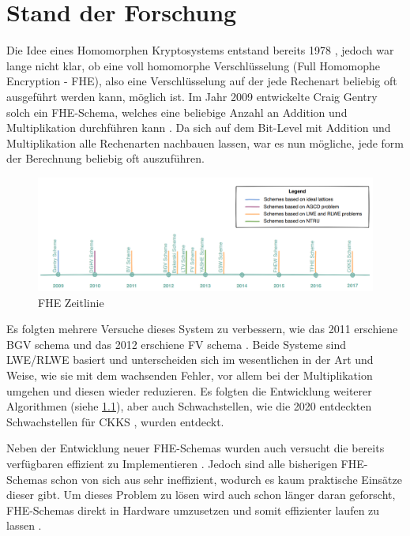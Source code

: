 \chapter{Stand der Forschung}
\label{StandDerForschung}

Die Idee eines Homomorphen Kryptosystems entstand bereits 1978 \cite{Rivest1978ONDB}, jedoch war lange nicht klar, ob eine voll homomorphe Verschlüsselung (Full Homomophe Encryption - FHE), also eine Verschlüsselung auf der jede Rechenart beliebig oft ausgeführt werden kann, möglich ist. Im Jahr 2009 entwickelte Craig Gentry solch ein FHE-Schema, welches eine beliebige Anzahl an Addition und Multiplikation durchführen kann \cite{Gentry2009AFH}. Da sich auf dem Bit-Level mit Addition und Multiplikation alle Rechenarten nachbauen lassen, war es nun mögliche, jede form der Berechnung beliebig oft auszuführen.

\begin{figure}
  \includegraphics[scale=0.45]{bilder/FHE-Timeline.png}
  \caption{FHE Zeitlinie \cite{FHESurvey}}
  \label{fig:FheTimeline}
\end{figure}

Es folgten mehrere Versuche dieses System zu verbessern, wie das 2011 erschiene BGV schema \cite{BGV} und das 2012 erschiene FV schema \cite{FV}. Beide Systeme sind LWE/RLWE basiert und unterscheiden sich im wesentlichen in der Art und Weise, wie sie mit dem wachsenden Fehler, vor allem bei der Multiplikation umgehen und diesen wieder reduzieren. Es folgten die Entwicklung weiterer Algorithmen (siehe \ref{fig:FheTimeline}), aber auch Schwachstellen, wie die 2020 entdeckten Schwachstellen für CKKS \cite{SecurtyCKKS}, wurden entdeckt.

Neben der Entwicklung neuer FHE-Schemas wurden auch versucht die bereits verfügbaren effizient zu Implementieren  \cite{FheImplementations}. Jedoch sind alle bisherigen FHE-Schemas schon von sich aus sehr ineffizient, wodurch es kaum praktische Einsätze dieser gibt. Um dieses Problem zu lösen wird auch schon länger daran geforscht, FHE-Schemas direkt in Hardware umzusetzen und somit effizienter laufen zu lassen \cite{FheHardware2014} \cite{FheHardware2023}. 
